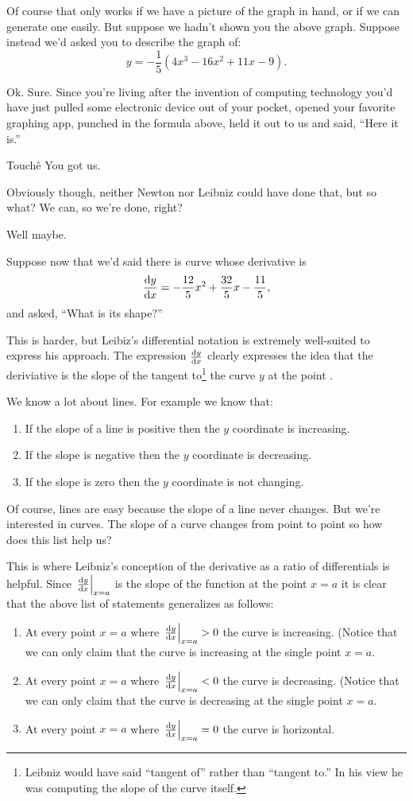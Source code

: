 Of course that only works if we have a picture of the graph in hand,
or if we can generate one easily. But suppose we hadn't shown you the
above graph. Suppose instead we'd asked you to describe the graph of:
$$
y=-\frac15(4x^3-16x^2+11x-9).
$$

Ok. Sure. Since you're living after the invention of computing
technology you'd have just pulled some electronic device out of your
pocket, opened your favorite graphing app, punched in the formula
above, held it out to us and said, ``Here it is.''

Touch\^{e} You got us.

Obviously though, neither Newton nor Leibniz could have done that, but
so what? We can, so we're done, right?

Well maybe.

Suppose now that we'd said there is  curve whose derivative
is
$$
\frac{\text{d}{y}}{\text{d}{x}}=-\frac{12}{5}x^2 +\frac{32}{5}x-\frac{11}{5},
$$
and asked, ``What is its shape?''

This is harder, but Leibiz's differential notation is extremely
well-suited to express his approach. The expression $\frac{\text{d}{y}}{\text{d}{x}}$
clearly expresses the idea that the deriviative is the slope of the
tangent to\footnote{Leibniz would have said ``tangent of'' rather
than ``tangent to.'' In his view he was computing the slope of the
curve itself.} the curve $y$ at the point $.$

We know a lot about lines. For example we know that:
 \begin{enumerate}\label{list:FirstDerivTest-Lines}
\item If the slope of a line is positive then the $y$ coordinate is
  increasing.
\item If the slope is negative then the $y$ coordinate is decreasing.
\item If the slope is zero then the $y$ coordinate is not changing.
\end{enumerate}

Of course, lines are easy because the slope of a line never
changes. But we're interested in curves. The slope of a curve changes
from point to point so how does this list help us?

This is where Leibniz's conception of the derivative as a ratio of
differentials is helpful. Since $\left.{}\frac{\text{d}{y}}{\text{d}{x}}\right|_{x=a}$ is the slope of
the function at the point $x=a$ it is clear that the above list of
statements generalizes as follows:
\begin{enumerate}\label{list:FirstDerivTest-Leibniz}
\item At every point $x=a$ where $\left.{}\frac{\text{d}{y}}{\text{d}{x}}\right|_{x=a}>0$  the curve is
  increasing. (Notice that we can only claim that the curve is
  increasing at the single point $x=a.$ 
\item At every point $x=a$ where $\left.{}\frac{\text{d}{y}}{\text{d}{x}}\right|_{x=a}<0$  the curve is
  decreasing. (Notice that we can only claim that the curve is
  decreasing at the single point $x=a.$ 
\item At every point $x=a$ where $\left.{}\frac{\text{d}{y}}{\text{d}{x}}\right|_{x=a}=0$  the curve is
  horizontal.
\end{enumerate}

